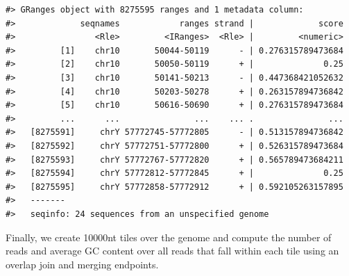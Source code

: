 \documentclass[]{article}
\newenvironment{Shaded}{\begin{snugshade}}{\end{snugshade}}
\newcommand{\DataTypeTok}[1]{\textcolor[rgb]{0.13,0.29,0.53}{#1}}
\newcommand{\KeywordTok}[1]{\textcolor[rgb]{0.13,0.29,0.53}{\textbf{#1}}}
\newcommand{\NormalTok}[1]{#1}
\newcommand{\OperatorTok}[1]{\textcolor[rgb]{0.81,0.36,0.00}{\textbf{#1}}}
\newcommand{\StringTok}[1]{\textcolor[rgb]{0.31,0.60,0.02}{#1}}
\begin{document}
\begin{verbatim}
#> GRanges object with 8275595 ranges and 1 metadata column:
#>             seqnames            ranges strand |             score
#>                <Rle>         <IRanges>  <Rle> |         <numeric>
#>         [1]    chr10       50044-50119      - | 0.276315789473684
#>         [2]    chr10       50050-50119      + |              0.25
#>         [3]    chr10       50141-50213      - | 0.447368421052632
#>         [4]    chr10       50203-50278      + | 0.263157894736842
#>         [5]    chr10       50616-50690      + | 0.276315789473684
#>         ...      ...               ...    ... .               ...
#>   [8275591]     chrY 57772745-57772805      - | 0.513157894736842
#>   [8275592]     chrY 57772751-57772800      + | 0.526315789473684
#>   [8275593]     chrY 57772767-57772820      + | 0.565789473684211
#>   [8275594]     chrY 57772812-57772845      + |              0.25
#>   [8275595]     chrY 57772858-57772912      + | 0.592105263157895
#>   -------
#>   seqinfo: 24 sequences from an unspecified genome
\end{verbatim}

Finally, we create 10000nt tiles over the genome and compute the number
of reads and average GC content over all reads that fall within each
tile using an overlap join and merging endpoints.

\begin{Shaded}
\end{Shaded}
\end{document}
